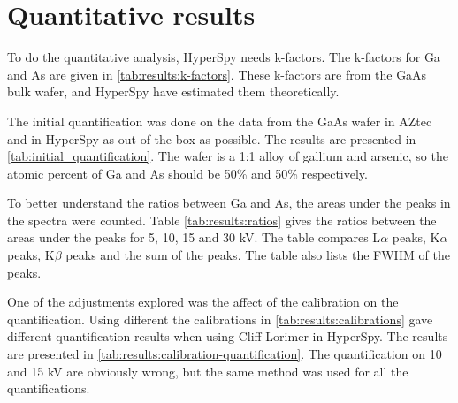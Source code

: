 \section{Quantitative results}
\label{sec:results:quantification}





To do the quantitative analysis, HyperSpy needs k-factors.
The k-factors for Ga and As are given in \cref{tab:results:k-factors}.
These k-factors are from the GaAs bulk wafer, and HyperSpy have estimated them theoretically.



The initial quantification was done on the data from the GaAs wafer in AZtec and in HyperSpy as out-of-the-box as possible.
The results are presented in \cref{tab:initial_quantification}.
The wafer is a 1:1 alloy of gallium and arsenic, so the atomic percent of Ga and As should be 50\% and 50\% respectively.



To better understand the ratios between Ga and As, the areas under the peaks in the spectra were counted.
Table \cref{tab:results:ratios} gives the ratios between the areas under the peaks for 5, 10, 15 and 30 kV.
The table compares L$\alpha$ peaks, K$\alpha$ peaks, K$\beta$ peaks and the sum of the peaks.
The table also lists the FWHM of the peaks.




One of the adjustments explored was the affect of the calibration on the quantification.
Using different the calibrations in \cref{tab:results:calibrations} gave different quantification results when using Cliff-Lorimer in HyperSpy. %
The results are presented in \cref{tab:results:calibration-quantification}.
The quantification on 10 and 15 kV are obviously wrong, but the same method was used for all the  quantifications.


